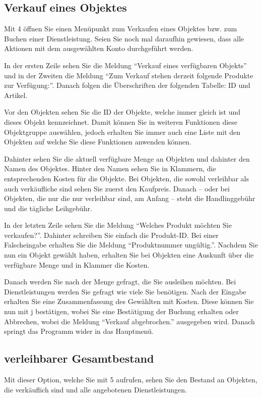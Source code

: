 \documentclass[a4paper,12pt,titlepage]{article}
\begin{document}
\subsection{Verkauf eines Objektes}
Mit 4 öffnen Sie einen Menüpunkt zum Verkaufen eines Objektes bzw. zum Buchen einer Dienstleistung.
Seien Sie noch mal daraufhin gewiesen, dass alle Aktionen mit dem ausgewählten Konto durchgeführt werden.

In der ersten Zeile sehen Sie die Meldung \enquote{Verkauf eines verfügbaren Objekts}
 und in der Zweiten die Meldung \enquote{Zum Verkauf stehen derzeit folgende Produkte zur Verfügung:}.
Danach folgen die Überschriften der folgenden Tabelle: ID und Artikel.

Vor den Objekten sehen Sie die ID der Objekte, welche immer gleich ist und dieses Objekt kennzeichnet.
Damit können Sie in weiteren Funktionen diese Objektgruppe auswählen,
 jedoch erhalten Sie immer auch eine Liste mit den Objekten auf welche Sie diese Funktionen anwenden können.

Dahinter sehen Sie die aktuell verfügbare Menge an Objekten und dahinter den Namen des Objektes.
Hinter den Namen sehen Sie in Klammern, die entsprechenden Kosten für die Objekte.
Bei Objekten, die sowohl verleihbar als auch verkäufliche sind sehen Sie zuerst den Kaufpreis.
Danach -- oder bei Objekten, die nur die nur verleihbar sind, am Anfang --
steht die Handlinggebühr und die tägliche Leihgebühr.

In der letzten Zeile sehen Sie die Meldung \enquote{Welches Produkt möchten Sie verkaufen?}.
Dahinter schreiben Sie einfach die Produkt-ID. Bei einer Falscheingabe erhalten Sie die Meldung \enquote{Produktnummer ungültig.}.
Nachdem Sie nun ein Objekt gewählt haben,
 erhalten Sie bei Objekten eine Auskunft über die verfügbare Menge und in Klammer die Kosten.

Danach werden Sie nach der Menge gefragt, die Sie ausleihen möchten.
Bei Dienstleistungen werden Sie gefragt wie viele Sie benötigen.
Nach der Eingabe erhalten Sie eine Zusammenfassung des Gewählten mit Kosten. 
Diese können Sie nun mit j bestätigen, wobei Sie eine Bestätigung der Buchung erhalten oder Abbrechen,
 wobei die Meldung \enquote{Verkauf abgebrochen.} ausgegeben wird.
Danach springt das Programm wider in das Hauptmenü.

\subsection{verleihbarer Gesamtbestand}
Mit dieser Option, welche Sie mit 5 aufrufen, sehen Sie den Bestand an Objekten,
 die verkäuflich sind und alle angebotenen Dienstleistungen.
\end{document}
